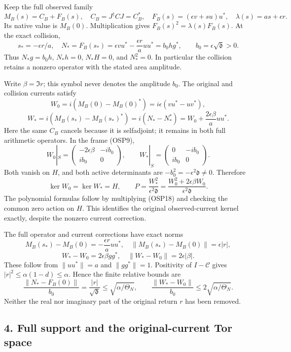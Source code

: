 \documentclass[
]{article}
\begin{document}
Keep the full observed family \[
M_B(s)=C_B+F_B(s),\quad C_B=J^\dagger CJ=C_B^*,\quad
F_B(s)=(\epsilon v+su)u^*,\quad\lambda(s)=as+\epsilon r.
\tag{OSP15}
\] Its native value is \(M_B(0)\). Multiplication gives
\(F_B(s)^2=\lambda(s)F_B(s)\). At the exact collision, \[
s_*=-\epsilon r/a,\quad
N_*=F_B(s_*)=\epsilon vu^*-\frac{\epsilon r}{a}uu^*
=b_0hg^*,\qquad b_0=\epsilon\sqrt{\mathfrak d}>0.
\tag{OSP16}
\] Thus \(N_*g=b_0h\), \(N_*h=0\), \(N_*H=0\), and \(N_*^2=0\). In
particular the collision retains a nonzero operator with the stated area
amplitude.

Write \(\beta=\Im r\); this symbol never denotes the amplitude \(b_0\).
The original and collision currents satisfy \[
W_0=i(M_B(0)-M_B(0)^*)=i\epsilon(vu^*-uv^*),
\] \[
W_*=i(M_B(s_*)-M_B(s_*)^*)=i(N_*-N_*^*)
=W_0+\frac{2\epsilon\beta}{a}uu^*.
\tag{OSP17}
\] Here the same \(C_B\) cancels because it is selfadjoint; it remains
in both full arithmetic operators. In the frame (OSP9), \[
W_0|_S=\begin{pmatrix}-2\epsilon\beta&-ib_0\\ib_0&0\end{pmatrix},
\qquad W_*|_S=\begin{pmatrix}0&-ib_0\\ib_0&0\end{pmatrix}.
\tag{OSP18}
\] Both vanish on \(H\), and both active determinants are
\(-b_0^2=-\epsilon^2\mathfrak d\ne0\). Therefore \[
\ker W_0=\ker W_*=H,\qquad
P=\frac{W_*^2}{\epsilon^2\mathfrak d}
=\frac{W_0^2+2\epsilon\beta W_0}{\epsilon^2\mathfrak d}.
\tag{OSP19}
\] The polynomial formulas follow by multiplying (OSP18) and checking
the common zero action on \(H\). This identifies the original
observed-current kernel exactly, despite the nonzero current correction.

The full operator and current corrections have exact norms \[
M_B(s_*)-M_B(0)=-\frac{\epsilon r}{a}uu^*,\quad
\|M_B(s_*)-M_B(0)\|=\epsilon|r|,
\] \[
W_*-W_0=2\epsilon\beta gg^*,\quad
\|W_*-W_0\|=2\epsilon|\beta|.
\tag{OSP20}
\] These follow from \(\|uu^*\|=a\) and \(\|gg^*\|=1\). Positivity of
\(I-\mathcal C\) gives \(|r|^2\le\alpha(1-d)\le\alpha\). Hence the
finite relative bounds are \[
\frac{\|N_*-F_B(0)\|}{b_0}=\frac{|r|}{\sqrt{\mathfrak d}}
\le\sqrt{\alpha/\Theta_N},\qquad
\frac{\|W_*-W_0\|}{b_0}\le2\sqrt{\alpha/\Theta_N}.
\tag{OSP21}
\] Neither the real nor imaginary part of the original return \(r\) has
been removed.

\subsection{4. Full support and the original-current Tor
space}\label{full-support-and-the-original-current-tor-space}
\end{document}
